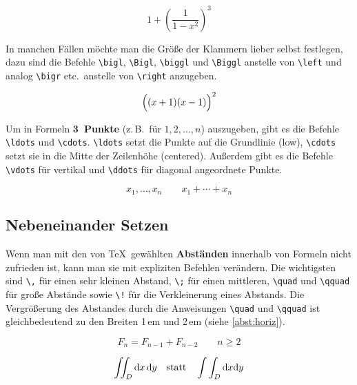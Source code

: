 \begin{LTXexample}
\[
1 + \left( \frac{1}{ 1-x^{2} }
    \right) ^3
\]
\end{LTXexample}


In manchen Fällen möchte man die Größe der Klammern lieber
selbst festlegen, dazu sind die Befehle
\lstinline|\bigl|,
\lstinline|\Bigl|,
\lstinline|\biggl| und
\lstinline|\Biggl| anstelle von \lstinline|\left|
und analog \lstinline|\bigr| etc.\ anstelle von \lstinline|\right|
anzugeben.

\begin{LTXexample}
\[
\Bigl( (x+1) (x-1) \Bigr) ^{2}
\]
\end{LTXexample}

Um in Formeln \textbf{3~Punkte} (z.\,B.\ für \(1,2,\ldots,n\))
auszugeben, gibt es die Befehle
\lstinline|\ldots| und \lstinline|\cdots|.
\lstinline|\ldots| setzt die Punkte auf die Grundlinie (low),
\lstinline|\cdots| setzt sie in die Mitte der Zeilenhöhe
(centered).
Außerdem gibt es die Befehle
\lstinline|\vdots| für vertikal und
\lstinline|\ddots| für diagonal angeordnete Punkte.

\begin{LTXexample}
\[
x_{1},\ldots,x_{n} \qquad
x_{1}+\cdots+x_{n}
\]
\end{LTXexample}


\subsection{Nebeneinander Setzen}

Wenn man mit den von \TeX\ gewählten \textbf{Abständen}
innerhalb von Formeln nicht zufrieden ist, kann man sie mit
expliziten Befehlen verändern. Die wichtigsten sind
\lstinline|\,| für einen sehr kleinen Abstand,
\lstinline|\;| für einen mittleren,
\lstinline|\quad| und \lstinline|\qquad| für große Abstände sowie
\lstinline|\!| für die Verkleinerung eines Abstands. Die Vergrößerung des Abstandes
durch die Anweisungen \lstinline|\quad| und \lstinline|\qquad| ist gleichbedeutend zu den Breiten 1\,em und 2\,em (siehe \vref{abst:horiz}).

\begin{LTXexample}
\[
F_{n} = F_{n-1} + F_{n-2}
 \qquad n \ge 2
\]
\end{LTXexample}


\begin{LTXexample}
\[
\int\!\!\!\int_{D}
\mathrm{d}x\,\mathrm{d}y
\quad \textnormal{statt} \quad
\int\int_{D}
\mathrm{d}x \mathrm{d}y
\]
\end{LTXexample}



